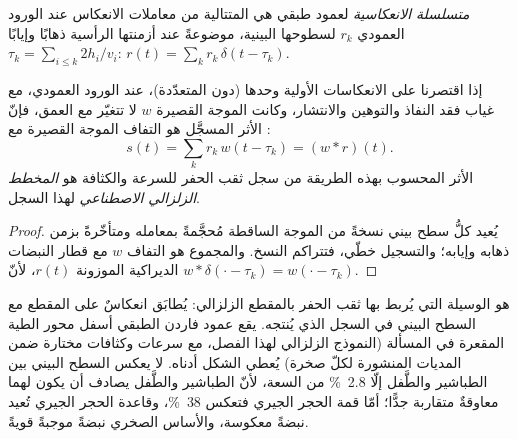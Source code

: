 \begin{definition}\label{def:b3:exploration-seismology:synthetic}
\emph{متسلسلة الانعكاسية} لعمود طبقي هي
المتتالية من معاملات الانعكاس عند الورود العمودي $r_k$ لسطوحها البينية،
موضوعةً عند أزمنتها الرأسية ذهابًا وإيابًا $\tau_k = \sum_{i \le k} 2h_i/v_i$:
$r(t) = \sum_k r_k\,\delta(t - \tau_k)$.
\end{definition}

\begin{proposition}\label{prop:b3:exploration-seismology:synthetic}
إذا اقتصرنا على الانعكاسات الأولية وحدها (دون المتعدّدة)، عند الورود العمودي، مع
غياب فقد النفاذ والتوهين والانتشار، وكانت الموجة القصيرة $w$ لا
تتغيّر مع العمق، فإنّ الأثر المسجَّل هو التفاف الموجة القصيرة مع
:
\[
  s(t) = \sum_k r_k\,w(t - \tau_k) = (w*r)(t) .
\]
الأثر المحسوب بهذه الطريقة من سجل ثقب الحفر للسرعة والكثافة هو
\emph{المخطط الزلزالي الاصطناعي} لهذا السجل.
\end{proposition}

\begin{proof}
يُعيد كلُّ سطح بيني نسخةً من الموجة الساقطة مُحجَّمةً بمعامله
ومتأخّرةً بزمن ذهابه وإيابه؛ والتسجيل خطّي، فتتراكم النسخ.
والمجموع هو التفاف $w$ مع قطار النبضات الديراكية الموزونة
$r(t)$، لأنّ $w*\delta(\cdot - \tau_k) = w(\cdot - \tau_k)$.
\end{proof}

 هو الوسيلة التي يُربط بها ثقب الحفر بالمقطع الزلزالي:
يُطابَق انعكاسٌ على المقطع مع السطح البيني في السجل الذي يُنتجه.
يقع عمود فاردن الطبقي أسفل محور الطية المقعرة في المسألة (النموذج الزلزالي
لهذا الفصل، مع سرعات وكثافات مختارة ضمن المديات المنشورة
لكلّ صخرة)
يُعطي الشكل أدناه. لا يعكس السطح البيني بين الطباشير والطَّفل إلّا
\qty{2.8}{\percent} من السعة، لأنّ الطباشير والطَّفل يصادف أن يكون لهما
معاوقةٌ متقاربة جدًّا؛ أمّا قمة الحجر الجيري فتعكس \qty{38}{\percent}،
وقاعدة الحجر الجيري تُعيد نبضةً معكوسة، والأساس الصخري نبضةً
موجبةً قويةً.

